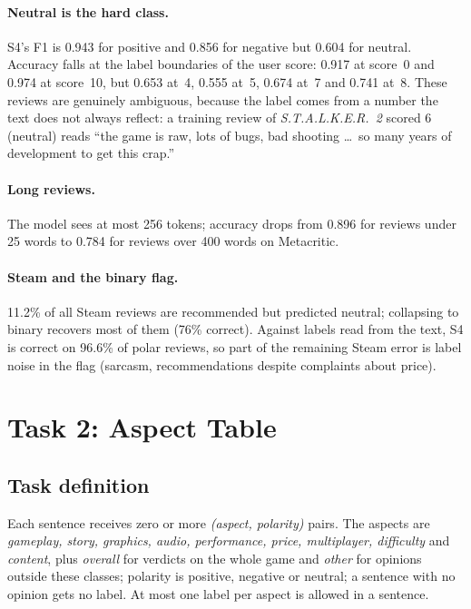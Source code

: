 \documentclass[11pt,a4paper]{article}
\begin{document}
\paragraph{Neutral is the hard class.} S4's F1 is 0.943 for positive and 0.856 for negative
but 0.604 for neutral. Accuracy falls at the label boundaries of the user score: 0.917 at
score~0 and 0.974 at score~10, but 0.653 at~4, 0.555 at~5, 0.674 at~7 and 0.741 at~8. These
reviews are genuinely ambiguous, because the label comes from a number the text does not
always reflect: a training review of \emph{S.T.A.L.K.E.R.~2} scored 6 (neutral) reads ``the
game is raw, lots of bugs, bad shooting \dots\ so many years of development to get this
crap.''

\paragraph{Long reviews.} The model sees at most 256 tokens; accuracy drops from 0.896 for
reviews under 25 words to 0.784 for reviews over 400 words on Metacritic.

\paragraph{Steam and the binary flag.} 11.2\% of all Steam reviews are recommended but
predicted neutral; collapsing to binary recovers most of them (76\% correct). Against labels
read from the text, S4 is correct on 96.6\% of polar reviews, so part of the remaining Steam
error is label noise in the flag (sarcasm, recommendations despite complaints about price).

\section{Task 2: Aspect Table}
\label{sec:task2}

\subsection{Task definition}

Each sentence receives zero or more \emph{(aspect, polarity)} pairs. The aspects are
\emph{gameplay, story, graphics, audio, performance, price, multiplayer, difficulty} and
\emph{content}, plus \emph{overall} for verdicts on the whole game and \emph{other} for
opinions outside these classes; polarity is positive, negative or neutral; a sentence with no
opinion gets no label. At most one label per aspect is allowed in a sentence.
\end{document}
